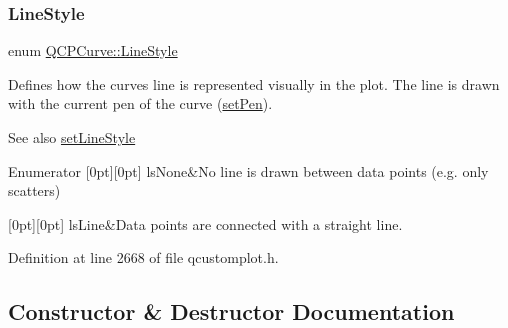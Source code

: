 \subsubsection{\texorpdfstring{Line\+Style}{LineStyle}}
{\footnotesize\ttfamily enum \hyperlink{class_q_c_p_curve_a2710e9f79302152cff794c6e16cc01f1}{Q\+C\+P\+Curve\+::\+Line\+Style}}

Defines how the curve\textquotesingle{}s line is represented visually in the plot. The line is drawn with the current pen of the curve (\hyperlink{class_q_c_p_abstract_plottable_ab74b09ae4c0e7e13142fe4b5bf46cac7}{set\+Pen}). \begin{DoxySeeAlso}{See also}
\hyperlink{class_q_c_p_curve_a4a377ec863ff81a1875c3094a6177c19}{set\+Line\+Style} 
\end{DoxySeeAlso}
\begin{DoxyEnumFields}{Enumerator}
[0pt][0pt]{}\mbox{\label{class_q_c_p_curve_a2710e9f79302152cff794c6e16cc01f1aec1601a191cdf0b4e761c4c66092cc48}} 
ls\+None&No line is drawn between data points (e.\+g. only scatters) \\
\hline

[0pt][0pt]{}\mbox{\label{class_q_c_p_curve_a2710e9f79302152cff794c6e16cc01f1ade5822ce6fbf131d3df131795c2e1003}} 
ls\+Line&Data points are connected with a straight line. \\
\hline

\end{DoxyEnumFields}


Definition at line 2668 of file qcustomplot.\+h.



\subsection{Constructor \& Destructor Documentation}
\mbox{\label{class_q_c_p_curve_a36de58e2652b3fa47bdf9187d421d3ce}} 
